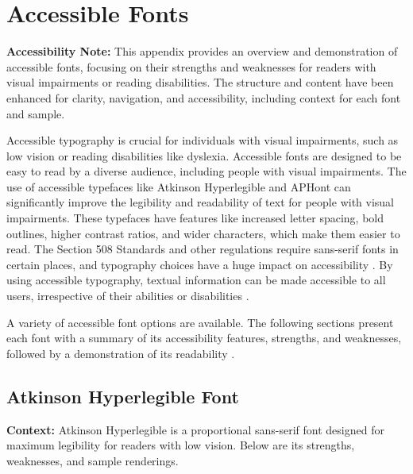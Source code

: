 \chapter{Accessible Fonts}\label{appx66}
\begin{raggedright}
\textbf{Accessibility Note:} This appendix provides an overview and demonstration of accessible fonts, focusing on their strengths and weaknesses for readers with visual impairments or reading disabilities. The structure and content have been enhanced for clarity, navigation, and accessibility, including context for each font and sample.

Accessible typography is crucial for individuals with visual impairments, such as low vision or reading disabilities like dyslexia. Accessible fonts are designed to be easy to read by a diverse audience, including people with visual impairments. The use of accessible typefaces like Atkinson Hyperlegible and APHont can significantly improve the legibility and readability of text for people with visual impairments. These typefaces have features like increased letter spacing, bold outlines, higher contrast ratios, and wider characters, which make them easier to read. The Section 508 Standards \cite{Section508} and other regulations require sans-serif fonts in certain places, and typography choices have a huge impact on accessibility \cite{AccessiBe}. By using accessible typography, textual information can be made accessible to all users, irrespective of their abilities or disabilities \cite{ReadabilityGroup, HubSpot}.

A variety of accessible font options are available. The following sections present each font with a summary of its accessibility features, strengths, and weaknesses, followed by a demonstration of its readability \cite{EmptyBoxNote}.
\end{raggedright}


\section{Atkinson Hyperlegible Font}\label{sec:atkinson-hyperlegible}
\noindent
\textbf{Context:} Atkinson Hyperlegible is a proportional sans-serif font designed for maximum legibility for readers with low vision. Below are its strengths, weaknesses, and sample renderings.

